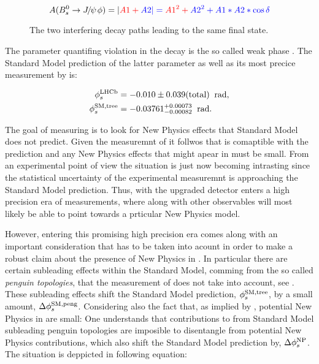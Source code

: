 \begin{equation}
  \centering
A(\BsJpsiPhi) = |\color{red}{A1} + \color{blue}{A2}| = \color{red}{A1}^2 + \color{blue}{A2}^2 + A1*A2*\cos\delta
  \label{app_interf_amp}
\end{equation}


\begin{figure}[h]
  \centering
  \resizebox{0.4\textwidth}{!}{}
  \caption{The two interfering decay paths leading to the same final state.}
  \label{app_interference}
\end{figure}

The parameter quantifing \CP violation in the \BsJpsiPhi decay is the so called weak phase \phis.
The Standard Model prediction of the latter parameter as well as its most precice measurement by
\lhcb is:

\begin{subequations}
  \label{app_phis_lhcb_theo}
  \begin{align}
  \centering
  \phiS{\lhcb}           &=  -0.010 \pm 0.039(\text{total})  \;\; \text{rad},
  \label{app_phis_lhcb}\\
  \phiS{SM,tree}  &= -0.03761 {}^{+0.00073}_{-0.00082}  \;\; \text{rad}.
  \label{app_phis_theo}
\end{align}
\end{subequations}

\noindent The goal of measuring \phis is to look for New Physics effects that Standard Model
does not predict. Given the measuremnt of  it follwos that \phis is comaptible
with the prediction and any New Physics effects that might apear in \phis must be small.
From an experimental point of view the situation is just now becoming intrasting
since the statistical uncertainty of the experimental measuremnt is approaching the Standard
Model prediction. Thus, with the upgraded \lhcb detector \phis enters a high precision era
of measurements, where along with other observables will most likely be able to point towards
a prticular New Physics model.

However, entering this promising high precision era comes along with an important consideration
that has to be taken into acount in order to make a robust claim about the presence of New Physics
in \phis. In particular there are certain subleading effects within the Standard Model, comming from
the so called {\it penguin topologies}, that the \phis measurement of  does not
take into account, see \figref{}. These subleading effects shift the Standard Model prediction, $\phi_{s}^{\tiny \text{SM,tree}}$,
by a small amount, $\Delta\phi_{s}^{\tiny\text{SM,peng}}$. Considering also the fact that, as implied by ,
potential New Physics in \phis are small: One understands that contributions to \phis from Standard
Model subleading penguin topologies are imposible to disentangle from potential New Physics contributions,
which also shift the Standard Model prediction by, $\Delta\phi_{s}^{\tiny \text{NP}}$.
The situation is deppicted in following equation:

